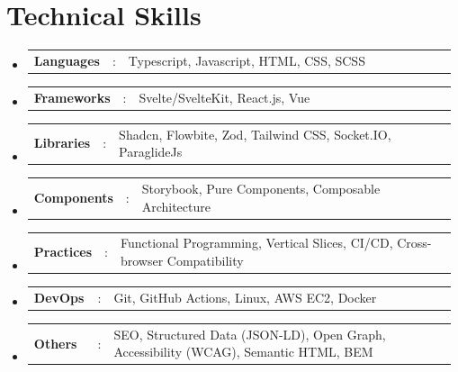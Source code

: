 \documentclass[a4paper,11pt]{article}
\newcommand{\resumeItem}[1]{
  \item\small{#1}
}
\newcommand{\resumeItemListStart}{\begin{itemize}[rightmargin=0.11in]}
\newcommand{\resumeItemListEnd}{\end{itemize}}
\newcommand{\resumeSectionType}[3]{
  \item\begin{tabular*}{0.96\textwidth}[t]{
    p{0.15\linewidth}p{0.02\linewidth}p{0.81\linewidth}
  }
    \textbf{#1} & #2 & #3
  \end{tabular*}\vspace{-2pt}
}
\newcommand{\resumeHeadingListStart}{
  \begin{itemize}[leftmargin=0.15in, label={}]
}
\newcommand{\resumeHeadingListEnd}{\end{itemize}}
\begin{document}

\section{Technical Skills}
  \resumeHeadingListStart{}
    \resumeSectionType{Languages}{:}{Typescript, Javascript, HTML, CSS, SCSS}
    \resumeSectionType{Frameworks}{:}{Svelte/SvelteKit, React.js, Vue}
    \resumeSectionType{Libraries}{:}{Shadcn, Flowbite, Zod, Tailwind CSS, Socket.IO, ParaglideJs}
    \resumeSectionType{Components}{:}{Storybook, Pure Components, Composable Architecture}
    \resumeSectionType{Practices}{:}{Functional Programming, Vertical Slices, CI/CD, Cross-browser Compatibility}
    \resumeSectionType{DevOps}{:}{Git, GitHub Actions, Linux, AWS EC2, Docker}
    \resumeSectionType{Others}{:}{SEO, Structured Data (JSON-LD), Open Graph, Accessibility (WCAG), Semantic HTML, BEM}
  \resumeHeadingListEnd{}


\end{document}

